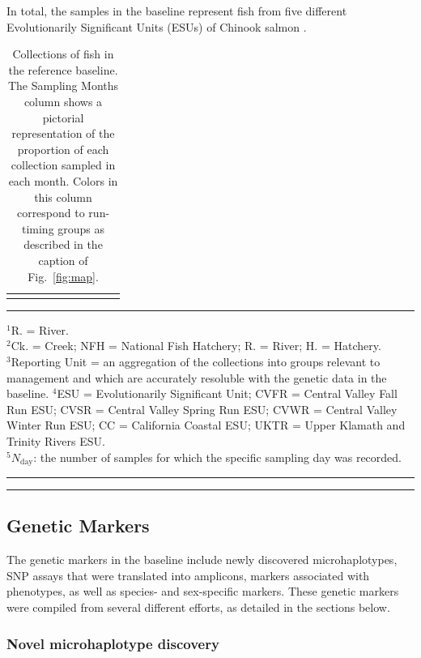 In total, the samples in the baseline represent fish from five different Evolutionarily Significant
Units (ESUs) of Chinook salmon \citep{waples1991pacific}.
\begin{table}
\caption{\footnotesize Collections of fish in the reference baseline.  The Sampling Months column shows
a pictorial representation of the proportion of each collection sampled in each month.  Colors in
this column correspond to run-timing groups as described in the caption of Fig.~\protect\ref{fig:map}.}
\label{tab:samples}
{\small
\begin{tabular*}{\linewidth}{@{\extracolsep{\fill}} lllllllrcr}
\hline\hline\vspace*{0.4ex}

\end{tabular*}
}
\rule{3cm}{0.3pt}

{\scriptsize
$^1$R. = River.\\
$^2$Ck. = Creek; NFH = National Fish Hatchery; R. = River; H. = Hatchery.\\
$^3$Reporting Unit = an aggregation of the collections into groups relevant to management and
which are accurately resoluble with the genetic data in the baseline.
$^4$ESU = Evolutionarily Significant Unit; CVFR = Central Valley Fall Run ESU; CVSR = Central Valley Spring Run ESU; CVWR =
Central Valley Winter Run ESU; CC = California Coastal ESU; UKTR = Upper Klamath and Trinity Rivers ESU. \\
$^5N_\mathrm{day}$: the number of samples for which the specific sampling day was recorded.
}
\hrule\vspace*{0.3ex}\hrule
\end{table}

\subsection*{Genetic Markers}

The genetic markers in the baseline include newly discovered microhaplotypes, SNP assays
that were translated into amplicons, markers associated with phenotypes, as well
as species- and sex-specific markers.
These genetic markers were compiled from several different
efforts, as detailed in the sections below.

\subsubsection*{Novel microhaplotype discovery}

